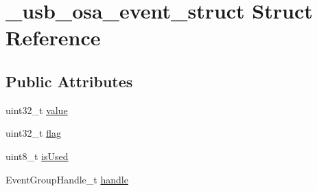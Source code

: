 \hypertarget{struct__usb__osa__event__struct}{\section{\-\_\-usb\-\_\-osa\-\_\-event\-\_\-struct Struct Reference}
\label{struct__usb__osa__event__struct}
}
\subsection*{Public Attributes}
\begin{DoxyCompactItemize}
\item 
uint32\-\_\-t \hyperlink{struct__usb__osa__event__struct_acad4db5b92af1808841439b32c5fcbca}{value}
\item 
uint32\-\_\-t \hyperlink{struct__usb__osa__event__struct_aaedaee45e96d8308e345703a13e28814}{flag}
\item 
uint8\-\_\-t \hyperlink{struct__usb__osa__event__struct_aa5b019861b02ab2e02240d564cf8f5a0}{is\-Used}
\item 
Event\-Group\-Handle\-\_\-t \hyperlink{struct__usb__osa__event__struct_aeb4dc367003aec9f7a6e20f9f295b33b}{handle}
\end{DoxyCompactItemize}


